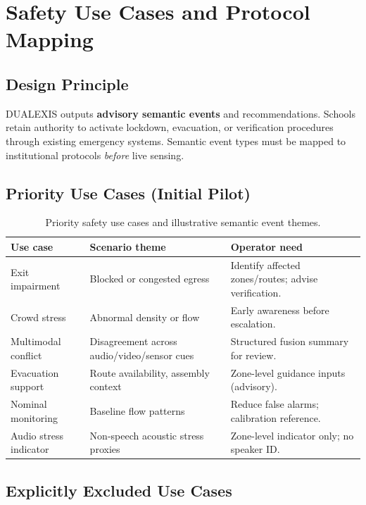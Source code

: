 \section{Safety Use Cases and Protocol Mapping}
\label{sec:safety-use-cases}

\subsection{Design Principle}

DUALEXIS outputs \textbf{advisory semantic events} and recommendations.
Schools retain authority to activate lockdown, evacuation, or verification procedures through
existing emergency systems.
Semantic event types must be mapped to institutional protocols \emph{before} live sensing.

\subsection{Priority Use Cases (Initial Pilot)}

\begin{table}[htbp]
  \centering
  \caption{Priority safety use cases and illustrative semantic event themes.}
  \label{tab:use-cases}
  \small
  \begin{tabular}{@{}p{3.2cm}p{4.2cm}p{4.6cm}@{}}
    \toprule
    Use case & Scenario theme & Operator need \\
    \midrule
    Exit impairment &
      Blocked or congested egress &
      Identify affected zones/routes; advise verification. \\
    Crowd stress &
      Abnormal density or flow &
      Early awareness before escalation. \\
    Multimodal conflict &
      Disagreement across audio/video/sensor cues &
      Structured fusion summary for review. \\
    Evacuation support &
      Route availability, assembly context &
      Zone-level guidance inputs (advisory). \\
    Nominal monitoring &
      Baseline flow patterns &
      Reduce false alarms; calibration reference. \\
    Audio stress indicator &
      Non-speech acoustic stress proxies &
      Zone-level indicator only; no speaker ID. \\
    \bottomrule
  \end{tabular}
\end{table}

\subsection{Explicitly Excluded Use Cases}

